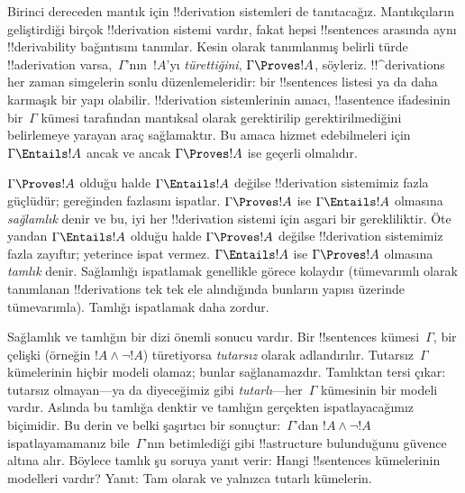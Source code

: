 



Birinci dereceden mantık için !!{derivation} sistemleri de tanıtacağız.
Mantıkçıların geliştirdiği birçok !!{derivation} sistemi vardır, fakat
hepsi !!{sentence}s arasında aynı !!{derivability} bağıntısını
tanımlar. Kesin olarak tanımlanmış belirli türde !!a{derivation}
varsa,~$\Gamma$'nın~$!A$'yı \emph{türettiğini},
$\Gamma\Proves !A$, söyleriz. !!^{derivation}s her zaman simgelerin
sonlu düzenlemeleridir: bir !!{sentence}s listesi ya da daha karmaşık
bir yapı olabilir. !!{derivation} sistemlerinin amacı, !!a{sentence}
ifadesinin bir~$\Gamma$ kümesi tarafından mantıksal olarak gerektirilip
gerektirilmediğini belirlemeye yarayan araç sağlamaktır. Bu amaca
hizmet edebilmeleri için $\Gamma\Entails !A$ ancak ve ancak
$\Gamma\Proves !A$ ise geçerli olmalıdır.

$\Gamma\Proves !A$ olduğu halde $\Gamma\Entails !A$ değilse
!!{derivation} sistemimiz fazla güçlüdür; gereğinden fazlasını
ispatlar. $\Gamma\Proves !A$ ise $\Gamma\Entails !A$ olmasına
\emph{sağlamlık} denir ve bu, iyi her !!{derivation} sistemi için
asgari bir gerekliliktir. Öte yandan $\Gamma\Entails !A$ olduğu halde
$\Gamma\Proves !A$ değilse !!{derivation} sistemimiz fazla zayıftır;
yeterince ispat vermez. $\Gamma\Entails !A$ ise $\Gamma\Proves !A$
olmasına \emph{tamlık} denir. Sağlamlığı ispatlamak genellikle görece
kolaydır (tümevarımlı olarak tanımlanan !!{derivation}s tek tek ele
alındığında bunların yapısı üzerinde tümevarımla). Tamlığı ispatlamak
daha zordur.

Sağlamlık ve tamlığın bir dizi önemli sonucu vardır. Bir
!!{sentence}s kümesi~$\Gamma$, bir çelişki (örneğin
$!A\land\lnot !A$) türetiyorsa \emph{tutarsız} olarak adlandırılır.
Tutarsız~$\Gamma$ kümelerinin hiçbir modeli olamaz; bunlar
sağlanamazdır. Tamlıktan tersi çıkar: tutarsız olmayan---ya da
diyeceğimiz gibi \emph{tutarlı}---her~$\Gamma$ kümesinin bir modeli
vardır. Aslında bu tamlığa denktir ve tamlığın gerçekten ispatlayacağımız
biçimidir. Bu derin ve belki şaşırtıcı bir sonuçtur:~$\Gamma$'dan
$!A\land\lnot !A$ ispatlayamamanız bile~$\Gamma$'nın betimlediği gibi
!!a{structure} bulunduğunu güvence altına alır. Böylece tamlık şu
soruya yanıt verir: Hangi !!{sentence}s kümelerinin modelleri vardır?
Yanıt: Tam olarak ve yalnızca tutarlı kümelerin.

